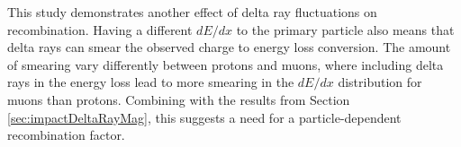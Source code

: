 This study demonstrates another effect of delta ray fluctuations on recombination.
Having a different $dE/dx$ to the primary particle also means that delta rays can smear the observed charge to energy loss conversion.
The amount of smearing vary differently between protons and muons, where including delta rays in the energy loss lead to more smearing in the $dE/dx$ distribution for muons than protons. 
Combining with the results from Section \ref{sec:impactDeltaRayMag}, this suggests a need for a particle-dependent recombination factor.   

%
%
